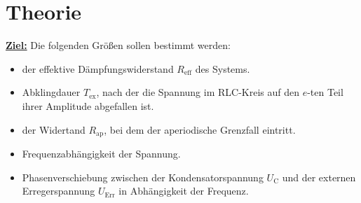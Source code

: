 \section{Theorie}

\textbf{\underline{Ziel:}}
Die folgenden Größen sollen bestimmt werden:
\begin{itemize}
  \item der effektive Dämpfungswiderstand $R_\text{eff}$ des Systems.
  \item Abklingdauer $T_\text{ex}$, nach der die Spannung im RLC-Kreis auf den $e$-ten Teil ihrer Amplitude abgefallen ist.
  \item der Widertand $R_\text{ap}$, bei dem der aperiodische Grenzfall eintritt.
  \item Frequenzabhängigkeit der Spannung.
  \item Phasenverschiebung zwischen der Kondensatorspannung $U_\text{C}$ und der externen Erregerspannung $U_\text{Err}$
  in Abhängigkeit der Frequenz.
\end{itemize}
